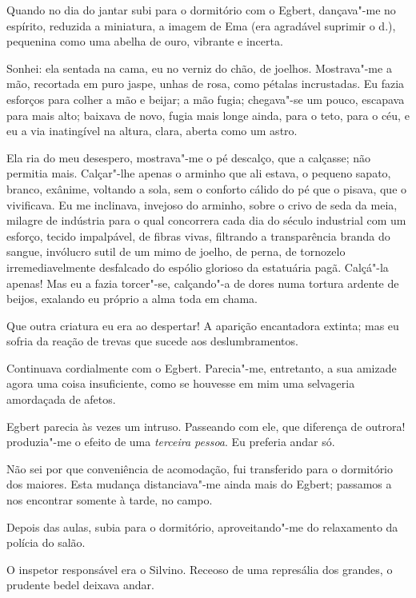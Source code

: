 Quando no dia do jantar subi para o dormitório com o Egbert, dançava"-me no
espírito, reduzida a miniatura, a imagem de Ema (era agradável suprimir
o d.), pequenina como uma abelha de ouro, vibrante e incerta. 

Sonhei: ela sentada na cama, eu no verniz do chão, de joelhos. Mostrava"-me a
mão, recortada em puro jaspe, unhas de rosa, como pétalas incrustadas.
Eu fazia esforços para colher a mão e beijar; a mão fugia; chegava"-se
um pouco, escapava para mais alto; baixava de novo, fugia mais longe
ainda, para o teto, para o céu, e eu a via inatingível na altura,
clara, aberta como um astro. 

Ela ria do meu desespero, mostrava"-me o
pé descalço, que a calçasse; não permitia mais. Calçar"-lhe apenas o
arminho que ali estava, o pequeno sapato, branco, exânime, voltando a
sola, sem o conforto cálido do pé que o pisava, que o vivificava. 
Eu me inclinava, invejoso
do arminho, sobre o crivo de seda da meia, milagre de indústria para o
qual concorrera cada dia do século industrial com um esforço, tecido
impalpável, de fibras vivas, filtrando a transparência branda do
sangue, invólucro sutil de um mimo de joelho, de perna, de tornozelo
irremediavelmente desfalcado do espólio glorioso da estatuária pagã.
Calçá"-la apenas! Mas eu a fazia torcer"-se, calçando"-a de dores
numa tortura ardente de beijos, exalando eu próprio a alma toda em
chama. 

Que outra criatura eu era ao despertar! A aparição encantadora
extinta; mas eu sofria da reação de trevas que sucede aos
deslumbramentos. 

Continuava cordialmente com o Egbert. Parecia"-me,
entretanto, a sua amizade agora uma coisa insuficiente, como se
houvesse em mim uma selvageria amordaçada de afetos. 

Egbert parecia às
vezes um intruso. Passeando com ele, que diferença de outrora!
produzia"-me o efeito de uma \textit{terceira pessoa}. Eu preferia andar só.

Não sei por que conveniência de acomodação, fui transferido para o
dormitório dos maiores. Esta mudança distanciava"-me ainda mais do
Egbert; passamos a nos encontrar somente à tarde, no campo. 

Depois das aulas, subia para o dormitório, aproveitando"-me do relaxamento da
polícia do salão. 

O inspetor responsável era o Silvino. Receoso de uma
represália dos grandes, o prudente bedel deixava andar. 

